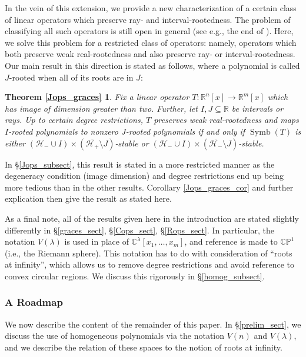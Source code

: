 \documentclass{article}
\theoremstyle{definition}
\theoremstyle{plain}
\newcommand{\C}{\mathbb{C}}
\newcommand{\R}{\mathbb{R}}
\newcommand{\CP}{\mathbb{CP}}
\newcommand{\UHP}{\mathcal{H}_+}
\newcommand{\LHP}{\mathcal{H}_-}
\DeclareMathOperator{\Symb}{Symb}
\begin{document}
In the vein of this extension, we provide a new characterization of a certain class of linear operators which preserve ray- and interval-rootedness. The problem of classifying all such operators is still open in general (see e.g., the end of \cite{bba}). Here, we solve this problem for a restricted class of operators: namely, operators which both preserve weak real-rootedness and also preserve ray- or interval-rootedness. Our main result in this direction is stated as follows, where a polynomial is called $J$-rooted when all of its roots are in $J$:

\newtheorem*{Jops_graces}{Theorem \ref{Jops_graces}}
\begin{Jops_graces}
    Fix a linear operator $T: \R^n[x] \to \R^m[x]$ which has image of dimension greater than two. Further, let $I,J \subseteq \R$ be intervals or rays. Up to certain degree restrictions, $T$ preserves weak real-rootedness and maps $I$-rooted polynomials to nonzero $J$-rooted polynomials if and only if $\Symb(T)$ is either $(\LHP \cup I) \times (\overline{\UHP} \setminus J)$-stable or $(\LHP \cup I) \times (\overline{\LHP} \setminus J)$-stable.
\end{Jops_graces}

In \S\ref{Jops_subsect}, this result is stated in a more restricted manner as the degeneracy condition (image dimension) and degree restrictions end up being more tedious than in the other results. Corollary \ref{Jops_graces_cor} and further explication then give the result as stated here.

As a final note, all of the results given here in the introduction are stated slightly differently in \S\ref{graces_sect}, \S\ref{Cops_sect}, \S\ref{Rops_sect}. In particular, the notation $V(\lambda)$ is used in place of $\C^\lambda[x_1,\ldots,x_m]$, and reference is made to $\CP^1$ (i.e., the Riemann sphere). This notation has to do with consideration of ``roots at infinity'', which allows us to remove degree restrictions and avoid reference to convex circular regions. We discuss this rigorously in \S\ref{homog_subsect}.

\subsubsection*{A Roadmap}

We now describe the content of the remainder of this paper. In \S\ref{prelim_sect}, we discuss the use of homogeneous polynomials via the notation $V(n)$ and $V(\lambda)$, and we describe the relation of these spaces to the notion of roots at infinity.
\end{document}
